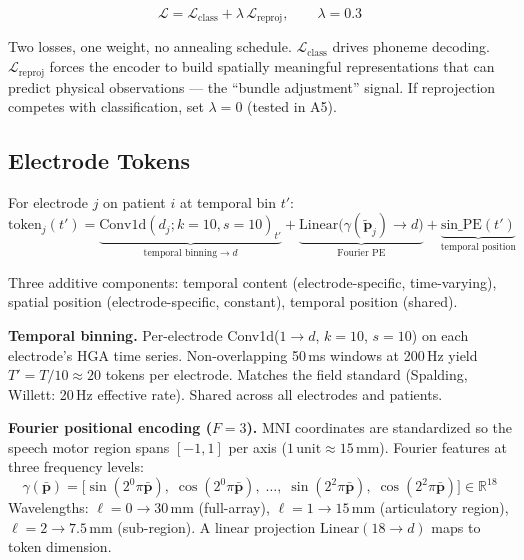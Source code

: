 \documentclass[11pt,letterpaper]{article}
\newcommand{\bfp}{\mathbf{p}}
\newcommand{\R}{\mathbb{R}}
\begin{document}
\begin{equation}
\boxed{\mathcal{L} = \mathcal{L}_{\text{class}} + \lambda \,\mathcal{L}_{\text{reproj}}, \qquad \lambda = 0.3}
\end{equation}

Two losses, one weight, no annealing schedule. $\mathcal{L}_{\text{class}}$ drives phoneme decoding. $\mathcal{L}_{\text{reproj}}$ forces the encoder to build spatially meaningful representations that can predict physical observations --- the ``bundle adjustment'' signal. If reprojection competes with classification, set $\lambda{=}0$ (tested in A5).


\subsection{Electrode Tokens}\label{sec:tokens}

For electrode $j$ on patient $i$ at temporal bin $t'$:
\begin{equation}
\text{token}_j(t') = \underbrace{\text{Conv1d}(d_j; k{=}10, s{=}10)_{t'}}_{\text{temporal binning} \to d} + \underbrace{\text{Linear}\bigl(\gamma(\tilde{\bfp}_j) \to d\bigr)}_{\text{Fourier PE}} + \underbrace{\text{sin\_PE}(t')}_{\text{temporal position}}
\end{equation}

Three additive components: temporal content (electrode-specific, time-varying), spatial position (electrode-specific, constant), temporal position (shared).

\textbf{Temporal binning.} Per-electrode Conv1d($1 \to d$, $k{=}10$, $s{=}10$) on each electrode's HGA time series. Non-overlapping 50\,ms windows at 200\,Hz yield $T' = T/10 \approx 20$ tokens per electrode. Matches the field standard (Spalding, Willett: 20\,Hz effective rate). Shared across all electrodes and patients.

\textbf{Fourier positional encoding ($F{=}3$).} MNI coordinates are standardized so the speech motor region spans $[{-}1, 1]$ per axis ($1\,\text{unit} \approx 15$\,mm). Fourier features at three frequency levels:
\begin{equation}
\gamma(\bar{\bfp}) = \bigl[\sin(2^0 \pi \bar{\bfp}),\; \cos(2^0 \pi \bar{\bfp}),\; \ldots,\; \sin(2^{2} \pi \bar{\bfp}),\; \cos(2^{2} \pi \bar{\bfp})\bigr] \in \R^{18}
\end{equation}
Wavelengths: $\ell{=}0 \to 30$\,mm (full-array), $\ell{=}1 \to 15$\,mm (articulatory region), $\ell{=}2 \to 7.5$\,mm (sub-region). A linear projection $\text{Linear}(18 \to d)$ maps to token dimension.
\end{document}
